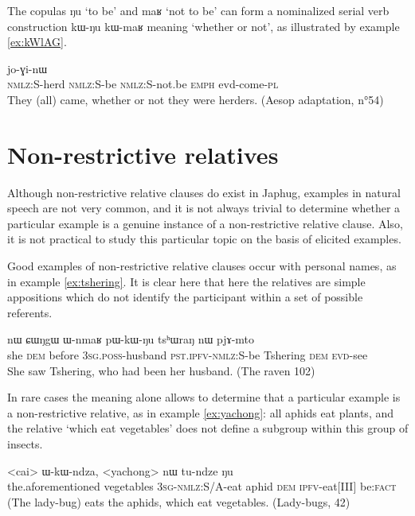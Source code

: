 \documentclass[oldfontcommands,oneside,a4paper,11pt]{article}
\newcommand{\ipa}[1]{{\phon #1}} %
\newcommand{\topic}{\textsc{dem}}
\begin{document}
The   copulas \ipa{ŋu} `to be' and \ipa{maʁ} `not to be' can form a nominalized serial verb construction \ipa{kɯ-ŋu} \ipa{kɯ-maʁ} meaning `whether or not', as illustrated by example \ref{ex:kWlAG}.


\begin{exe}
   \ex  \label{ex:kWlAG}
\gll 
[\ipa{kɯ-lɤɣ}  	\ipa{kɯ-ŋu}  	\ipa{kɯ-maʁ}]  	\ipa{ʑo}  	\ipa{jo-ɣi-nɯ}  \\
\textsc{nmlz:S}-herd \textsc{nmlz:S}-be \textsc{nmlz:S}-not.be \textsc{emph} evd-come-\textsc{pl} \\
\glt They (all) came, whether or not they were herders.
(Aesop adaptation, n°54)
\end{exe}

\section{Non-restrictive relatives}  \label{sec:non.restrictive} 

Although non-restrictive relative clauses do exist in Japhug, examples in natural speech are not very common, and it is not always trivial to determine whether a particular example is a genuine instance of a non-restrictive relative clause. Also, it is not practical to study this particular topic on the basis of elicited examples.

Good examples of non-restrictive relative clauses occur with personal names,  as in example \ref{ex:tshering}. It is clear here that here the relatives are simple appositions which do not identify the participant within a set of possible referents.


\begin{exe}
   \ex \label{ex:tshering}
\gll  \ipa{ɯʑo}  	\ipa{nɯ} \ipa{ɕɯŋgɯ}  	\ipa{ɯ-nmaʁ}  	\ipa{pɯ-kɯ-ŋu}  	\ipa{tsʰɯraŋ}  	\ipa{nɯ}  	\ipa{pjɤ-mto}  	\\
she \textsc{dem} before \textsc{3sg.poss}-husband \textsc{pst.ipfv-nmlz:S}-be Tshering \topic{} \textsc{evd}-see \\
 \glt   She saw Tshering, who had been her husband. (The raven 102)
   \end{exe} 

In rare cases the meaning alone allows to determine that a particular example  is a non-restrictive relative, as in example \ref{ex:yachong}: all aphids eat plants, and the relative `which eat vegetables' does not define a subgroup within this group of insects.

\begin{exe}
   \ex  \label{ex:yachong}
\gll \ipa{iɕqʰa}  	<cai>  	\ipa{ɯ-kɯ-ndza},  	<yachong>  	\ipa{nɯ}  	\ipa{tu-ndze}  	\ipa{ŋu}  \\
the.aforementioned vegetables \textsc{3sg-nmlz:}S/A-eat aphid \topic{} \textsc{ipfv}-eat[III] be:\textsc{fact} \\
\glt (The lady-bug) eats the aphids, which eat vegetables. (Lady-bugs, 42)
\end{exe}
\end{document}

